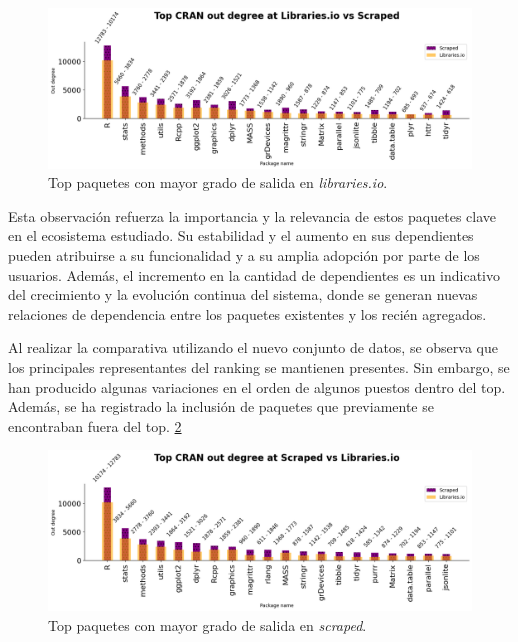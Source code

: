 \begin{figure}[h!]
    \begin{center}
        \includegraphics[width=1\textwidth]{img/cran/out_lib.png}
        \caption{Top paquetes con mayor grado de salida en \textit{libraries.io}.}
        \label{fig:cran_out_libio_top}
    \end{center}
\end{figure}

Esta observación refuerza la importancia y la relevancia de estos paquetes clave en el
ecosistema estudiado. Su estabilidad y el aumento en sus dependientes pueden atribuirse a
su funcionalidad y a su amplia adopción por parte de los usuarios. Además, el incremento en
la cantidad de dependientes es un indicativo del crecimiento y la evolución continua del
sistema, donde se generan nuevas relaciones de dependencia entre los paquetes existentes
y los recién agregados.

Al realizar la comparativa utilizando el nuevo conjunto de datos, se observa que los principales
representantes del ranking se mantienen presentes. Sin embargo, se han producido algunas variaciones
en el orden de algunos puestos dentro del top. Además, se ha registrado la inclusión de paquetes que
previamente se encontraban fuera del top. \ref{fig:cran_out_scraped_top}

\begin{figure}[h!]
    \begin{center}
        \includegraphics[width=1\textwidth]{img/cran/out_scr.png}
        \caption{Top paquetes con mayor grado de salida en \textit{scraped}.}
        \label{fig:cran_out_scraped_top}
    \end{center}
\end{figure}

